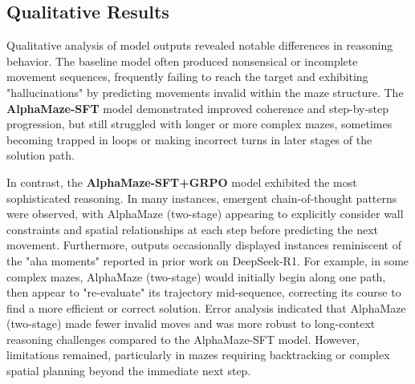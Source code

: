 \subsection{Qualitative Results}
\label{subsec:qualitative_results}

Qualitative analysis of model outputs revealed notable differences in reasoning behavior. The baseline model often produced nonsensical or incomplete movement sequences, frequently failing to reach the target and exhibiting "hallucinations" by predicting movements invalid within the maze structure. The \textbf{AlphaMaze-SFT} model demonstrated improved coherence and step-by-step progression, but still struggled with longer or more complex mazes, sometimes becoming trapped in loops or making incorrect turns in later stages of the solution path.

In contrast, the \textbf{AlphaMaze-SFT+GRPO} model exhibited the most sophisticated reasoning. In many instances, emergent chain-of-thought patterns were observed, with AlphaMaze (two-stage) appearing to explicitly consider wall constraints and spatial relationships at each step before predicting the next movement. Furthermore, outputs occasionally displayed instances reminiscent of the "aha moments" reported in prior work on DeepSeek-R1. For example, in some complex mazes, AlphaMaze (two-stage) would initially begin along one path, then appear to "re-evaluate" its trajectory mid-sequence, correcting its course to find a more efficient or correct solution. Error analysis indicated that AlphaMaze (two-stage) made fewer invalid moves and was more robust to long-context reasoning challenges compared to the AlphaMaze-SFT model. However, limitations remained, particularly in mazes requiring backtracking or complex spatial planning beyond the immediate next step.